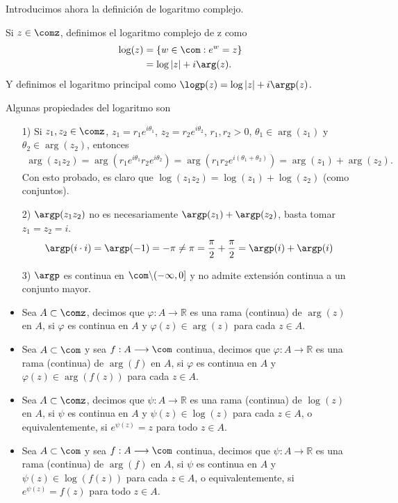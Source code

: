 Introducimos ahora la definición de logaritmo complejo.
\begin{defi}
Si $z \in \comz$, definimos el logaritmo complejo de z como
\begin{align*}
    \log(z) &= \{ w \in \com : e^w = z \} \\
    &= \log |z| + i\arg(z).
\end{align*}
Y definimos el logaritmo principal como $\logp(z) = \log|z| + i\argp(z)$.
\end{defi}
Algunas propiedades del logaritmo son
\begin{enumerate}
    \item[1)] Si $z_1,z_2 \in \comz$, $z_1 = r_1e^{i\theta_1}$, $z_2 = r_2e^{i\theta_2}$, $r_1,r_2 > 0$, $\theta_1 \in \arg(z_1)$ y $\theta_2 \in \arg(z_2)$, entonces
    \begin{align*}
        \arg(z_1z_2) = \arg(r_1e^{i\theta_1}r_2e^{i\theta_2}) = \arg(r_1r_2e^{i(\theta_1 + \theta_2)}) = \arg(z_1) + \arg(z_2).
    \end{align*}
    Con esto probado, es claro que $\log(z_1z_2) = \log(z_1) + \log(z_2)$ (como conjuntos).
    \item[2)] $\argp(z_1z_2)$ no es necesariamente $\argp(z_1) + \argp(z_2)$, basta tomar $z_1 = z_2 = i$.
    \begin{align*}
        \argp(i \cdot i) = \argp(-1) = -\pi \not = \pi = \frac{\pi}{2} + \frac{\pi}{2} = \argp(i) + \argp(i)
    \end{align*}
    \item[3)] $\argp$ es continua en $\com \backslash (-\infty,0]$ y no admite extensión continua a un conjunto mayor.
\end{enumerate}

\begin{defi}
\begin{itemize}
    \item Sea $A \subset \comz$, decimos que $\varphi : A \longrightarrow \mathbb{R}$ es una rama (continua) de $\arg(z)$ en $A$, si $\varphi$ es continua en $A$ y $\varphi(z) \in \arg(z)$ para cada $z \in A$.
    \item Sea $A \subset \com$ y sea $f: A \longrightarrow \com$ continua, decimos que $\varphi : A \longrightarrow \mathbb{R}$ es una rama (continua) de $\arg(f)$ en $A$, si $\varphi$ es continua en $A$ y $\varphi(z) \in \arg(f(z))$ para cada $z \in A$.
    \item Sea $A \subset \comz$, decimos que $\psi : A \longrightarrow \mathbb{R}$ es una rama (continua) de $\log(z)$ en $A$, si $\psi$ es continua en $A$ y $\psi(z) \in \log(z)$ para cada $z \in A$, o  equivalentemente, si $e^{\psi(z)} = z$ para todo $z \in A$.
    \item Sea $A \subset \com$ y sea $f: A \longrightarrow \com$ continua, decimos que $\psi : A \longrightarrow \mathbb{R}$ es una rama (continua) de $\arg(f)$ en $A$, si $\psi$ es continua en $A$ y $\psi(z) \in \log(f(z))$ para cada $z \in A$, o  equivalentemente, si $e^{\psi(z)} = f(z)$ para todo $z \in A$.
\end{itemize}
\end{defi}

